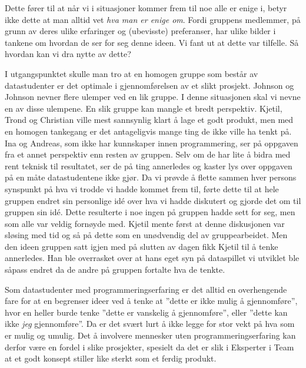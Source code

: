 	Dette fører til at når vi i situasjoner kommer frem til noe alle er enige i, betyr ikke dette at man alltid vet \emph{hva man er enige om}. Fordi gruppens medlemmer, på grunn av deres ulike erfaringer og (ubevisste) preferanser, har ulike bilder i tankene om hvordan de ser for seg denne ideen. Vi fant ut at dette var tilfelle. Så hvordan kan vi dra nytte av dette?

	I utgangspunktet skulle man tro at en homogen gruppe som består av datastudenter er det optimale i gjennomførelsen av et slikt prosjekt. Johnson og Johnson nevner flere ulemper ved en lik gruppe. I denne situasjonen skal vi nevne en av disse ulempene. En slik gruppe kan mangle et bredt perspektiv. Kjetil, Trond og Christian ville mest sannsynlig klart å lage et godt produkt, men med en homogen tankegang er det antageligvis mange ting de ikke ville ha tenkt på. Ina og Andreas, som ikke har kunnskaper innen programmering, ser på oppgaven fra et annet perspektiv enn resten av gruppen. Selv om de har lite å bidra med rent teknisk til resultatet, ser de på ting annerledes og kaster lys over oppgaven på en måte datastudentene ikke gjør. Da vi prøvde å flette sammen hver persons synspunkt på hva vi trodde vi hadde kommet frem til, førte dette til at hele gruppen endret sin personlige idé over hva vi hadde diskutert og gjorde det om til gruppen sin idé. Dette resulterte i noe ingen på gruppen hadde sett for seg, men som alle var veldig fornøyde med.  Kjetil mente først at denne diskusjonen var sløsing med tid og så på dette som en unødvendig del av gruppearbeidet. Men den ideen gruppen satt igjen med på slutten av dagen fikk Kjetil til å tenke annerledes. Han ble overrasket over at hans eget syn på dataspillet vi utviklet ble såpass endret da de andre på gruppen fortalte hva de tenkte. 


Som datastudenter med programmeringserfaring er det alltid en overhengende fare for at en begrenser ideer ved å tenke at ''dette er ikke mulig å gjennomføre'', hvor en heller burde tenke ''dette er vanskelig å gjennomføre'', eller ''dette kan ikke  \emph{jeg} gjennomføre''. Da er det svært lurt å ikke legge for stor vekt på hva som er mulig og umulig. Det å involvere mennesker uten programmeringserfaring kan derfor være en fordel i slike prosjekter, spesielt da det er slik i Eksperter i Team at et godt konsept stiller like sterkt som et ferdig produkt. 


